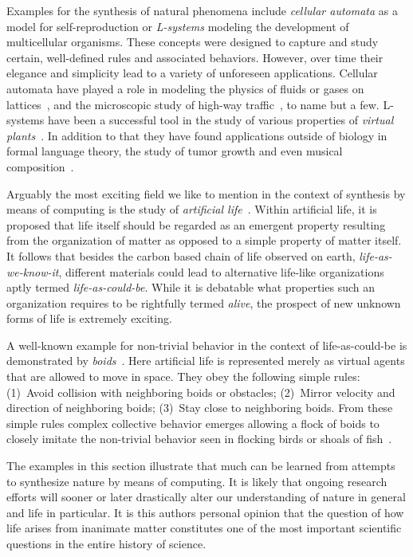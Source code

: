 		Examples for the synthesis of natural phenomena include \emph{cellular automata} as a model for self-reproduction or \emph{L-systems} modeling the development of multicellular organisms. These concepts were designed to capture and study certain, well-defined rules and associated behaviors. However, over time their elegance and simplicity lead to a variety of unforeseen applications. Cellular automata have played a role in modeling the physics of fluids or gases on lattices~\cite{rothman2004lattice}, and the microscopic study of high-way traffic~\cite{nagel1998two}, to name but a few. L-systems have been a successful tool in the study of various properties of \emph{virtual plants}~\cite{tardieu2003virtual}. In addition to that they have found applications outside of biology in formal language theory, the study of tumor growth and even musical composition~\cite{de2005natural}.

		Arguably the most exciting field we like to mention in the context of synthesis by means of computing is the study of \emph{artificial life}~\cite{Langton:1995:ALO:526815}. Within artificial life, it is proposed that life itself should be regarded as an emergent property resulting from the organization of matter as opposed to a simple property of matter itself. It follows that besides the carbon based chain of life observed on earth, \ie \emph{life-as-we-know-it}, different materials could lead to alternative life-like organizations aptly termed \emph{life-as-could-be}. While it is debatable what properties such an organization requires to be rightfully termed \emph{alive}, the prospect of new unknown forms of life is extremely exciting. 

		A well-known example for non-trivial behavior in the context of life-as-could-be is demonstrated by \emph{boids}~\cite{Reynolds:1987:FHS:37401.37406}. Here artificial life is represented merely as virtual agents that are allowed to move in space. They obey the following simple rules: (1)~Avoid collision with neighboring boids or obstacles; (2)~Mirror velocity and direction of neighboring boids; (3)~Stay close to neighboring boids. From these simple rules complex collective behavior emerges allowing a flock of boids to closely imitate the non-trivial behavior seen in flocking birds or shoals of fish~\cite{de2007fundamentals}.

		The examples in this section illustrate that much can be learned from attempts to synthesize nature by means of computing. It is likely that ongoing research efforts will sooner or later drastically alter our understanding of nature in general and life in particular. It is this authors personal opinion that the question of how life arises from inanimate matter constitutes one of the most important scientific questions in the entire history of science.

